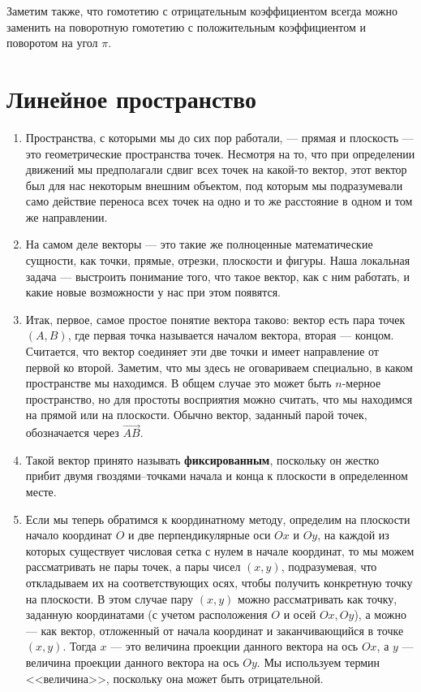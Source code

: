 Заметим также, что гомотетию с отрицательным коэффициентом всегда можно заменить на поворотную гомотетию с положительным коэффициентом и поворотом на угол $\pi$.


\section{Линейное пространство}


\begin{enumerate}

\item Пространства, с которыми мы до сих пор работали, --- прямая и плоскость --- это геометрические пространства точек. Несмотря на то, что при определении движений мы предполагали сдвиг всех точек на какой-то вектор, этот вектор был для нас некоторым внешним объектом, под которым мы подразумевали само действие переноса всех точек на одно и то же расстояние в одном и том же направлении.
\item На самом деле векторы --- это такие же полноценные математические сущности, как точки, прямые, отрезки, плоскости и фигуры. Наша локальная задача --- выстроить понимание того, что такое вектор, как с ним работать, и какие новые возможности у нас при этом появятся.
\item Итак, первое, самое простое понятие вектора таково: вектор есть пара точек $(A,B)$, где первая точка называется началом вектора, вторая --- концом. Считается, что вектор соединяет эти две точки и имеет направление от первой ко второй. Заметим, что мы здесь не оговариваем специально, в каком пространстве мы находимся. В общем случае это может быть $n$-мерное пространство, но для простоты восприятия можно считать, что мы находимся на прямой или на плоскости. Обычно вектор, заданный парой точек, обозначается через $\vec{AB}$.
\item Такой вектор принято называть \textbf{фиксированным}, поскольку он жестко прибит двумя гвоздями--точками начала и конца к плоскости в определенном месте.
\item Если мы теперь обратимся к координатному методу, определим на плоскости начало координат $O$ и две перпендикулярные оси $Ox$ и $Oy$, на каждой из которых существует числовая сетка с нулем в начале координат, то мы можем рассматривать не пары точек, а пары чисел $(x,y)$, подразумевая, что откладываем их на соответствующих осях, чтобы получить конкретную точку на плоскости. В этом случае пару $(x,y)$ можно рассматривать как точку, заданную координатами (с учетом расположения $O$ и осей $Ox,Oy$), а можно --- как вектор, отложенный от начала координат и заканчивающийся в точке $(x,y)$. Тогда $x$ --- это величина проекции данного вектора на ось $Ox$, а $y$ --- величина проекции данного вектора на ось $Oy$. Мы используем термин <<величина>>, поскольку она может быть отрицательной.

\end{enumerate}
